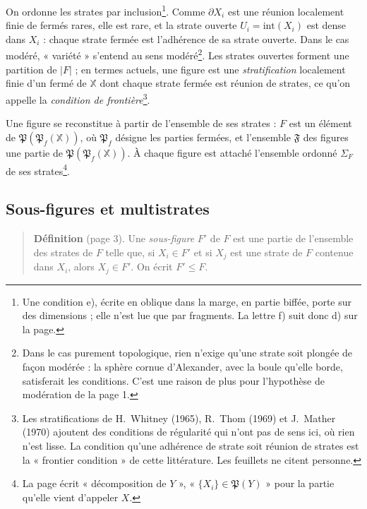 \documentclass[11pt,a4paper]{article}
\begin{document}
On ordonne les strates par inclusion\footnote{Une condition e), écrite en
oblique dans la marge, en partie biffée, porte sur des dimensions ; elle n'est
lue que par fragments. La lettre f) suit donc d) sur la page.}. Comme
$\partial X_{i}$ est une réunion localement finie de fermés rares, elle est
rare, et la strate ouverte $U_{i} = \mathrm{int}(X_{i})$ est dense dans
$X_{i}$ : chaque strate fermée est l'adhérence de sa strate ouverte. Dans le cas
modéré, « variété » s'entend au sens modéré\footnote{Dans le cas purement
topologique, rien n'exige qu'une strate soit plongée de façon modérée : la
sphère cornue d'Alexander, avec la boule qu'elle borde, satisferait les
conditions. C'est une raison de plus pour l'hypothèse de modération de la page
1.}. Les strates ouvertes forment une partition de $|F|$ ; en termes actuels,
une figure est une \emph{stratification} localement finie d'un fermé de
$\mathbb{X}$ dont chaque strate fermée est réunion de strates, ce qu'on
appelle la \emph{condition de frontière}\footnote{Les stratifications de
H.~Whitney (1965), R.~Thom (1969) et J.~Mather (1970) ajoutent des conditions
de régularité qui n'ont pas de sens ici, où rien n'est lisse. La condition
qu'une adhérence de strate soit réunion de strates est la « frontier
condition » de cette littérature. Les feuillets ne citent personne.}.

Une figure se reconstitue à partir de l'ensemble de ses strates : $F$ est un
élément de $\mathfrak{P}(\mathfrak{P}_{f}(\mathbb{X}))$, où
$\mathfrak{P}_{f}$ désigne les parties fermées, et l'ensemble $\mathfrak{F}$
des figures une partie de $\mathfrak{P}(\mathfrak{P}_{f}(\mathbb{X}))$. À
chaque figure est attaché l'ensemble ordonné $\Sigma_{F}$ de ses
strates\footnote{La page écrit « décomposition de $Y$ », « $\{X_{i}\} \in
\mathfrak{P}(Y)$ » pour la partie qu'elle vient d'appeler $X$.}.

\subsection*{Sous-figures et multistrates}

\begin{quote}
\textbf{Définition} (page 3). Une \emph{sous-figure} $F'$ de $F$ est une
partie de l'ensemble des strates de $F$ telle que, si $X_{i} \in F'$ et si
$X_{j}$ est une strate de $F$ contenue dans $X_{i}$, alors $X_{j} \in F'$. On
écrit $F' \leq F$.
\end{quote}
\end{document}
